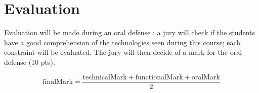 \documentclass{article}         %
\begin{document}
\section{Evaluation}

Evaluation will be made during an oral defense : a jury will check if the students have a good comprehension of the technologies seen during this course; each constraint will be evaluated. The jury will then decide of a mark for the oral defense (10 pts).

\[\text{finalMark} = \frac{\text{technicalMark} + \text{functionalMark} + \text{oralMark}}{2}\]


\begin{appendices}

\end{appendices}
\end{document}
